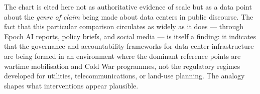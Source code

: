 \begin{fullwidth}
\begin{tcolorbox}[datacenterbox,
  title={Box 1\enspace Data centers as a megaproject? Scale, comparability, and the limits of the analogy}]
The chart is cited here not as authoritative evidence of scale but as a data point
about the \textit{genre of claim} being made about data centers in public discourse.
The fact that this particular comparison circulates as widely as it does — through
Epoch AI reports, policy briefs, and social media — is itself a finding: it indicates
that the governance and accountability frameworks for data center infrastructure are
being formed in an environment where the dominant reference points are wartime
mobilisation and Cold War programmes, not the regulatory regimes developed for
utilities, telecommunications, or land-use planning. The analogy shapes what
interventions appear plausible.

\end{tcolorbox}
\end{fullwidth}
